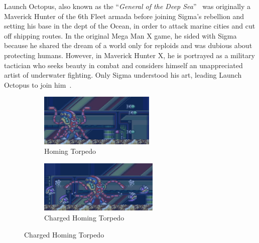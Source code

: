 Launch Octopus, also known as the ``\textit{General of the Deep Sea}''~\cite{book:MMX_Complete_art} was originally a Maverick Hunter of the 6th Fleet armada before joining Sigma's rebellion and setting his base in the dept of the Ocean, in order to attack marine cities and cut off shipping routes. In the original Mega Man X game, he sided with Sigma because he shared the dream of a world only for reploids and was dubious about protecting humans. However, in Maverick Hunter X, he is portrayed as a military tactician who seeks beauty in combat and considers himself an unappreciated artist of underwater fighting. Only Sigma understood his art, leading Launch Octopus to join him~\cite{wiki:MM_MHX_script}.

\begin{figure}[htp]
	\centering
	\begin{subfigure}{0.45\textwidth}
		\centering
		\includegraphics[height=2.5cm]{figures/X1/Launch_octopus/Octopus_missile.jpg}
		\caption{Homing Torpedo}
	\end{subfigure}
	\begin{subfigure}{0.45\textwidth}
		\centering
		\includegraphics[height=2.5cm]{figures/X1/Launch_octopus/Octopus_piranha.jpg}
		\caption{Charged Homing Torpedo}
	\end{subfigure}
\end{figure}

